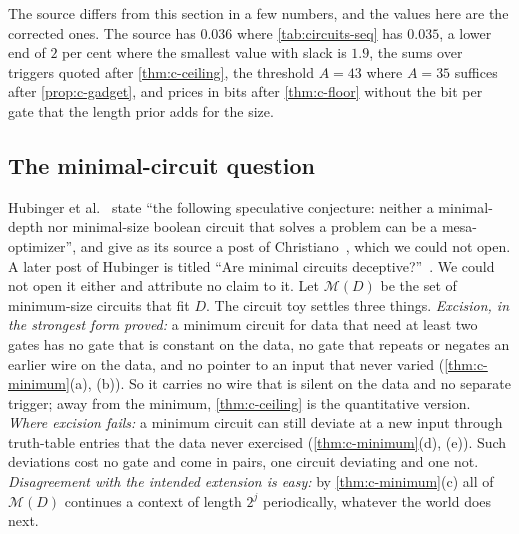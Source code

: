 The source differs from this section in a few numbers, and the values here are the corrected ones. The source
has $0.036$ where \cref{tab:circuits-seq} has $0.035$, a lower end of $2$ per cent where the smallest value
with slack is $1.9$, the sums over triggers quoted after \cref{thm:c-ceiling}, the threshold $A=43$ where
$A=35$ suffices after \cref{prop:c-gadget}, and prices in bits after \cref{thm:c-floor} without the bit per
gate that the length prior adds for the size.

\subsection{The minimal-circuit question}\label{sec:c-minimal}

Hubinger et al.~\cite{hubinger19} state ``the following speculative conjecture: neither a minimal-depth nor
minimal-size boolean circuit that solves a problem can be a mesa-optimizer'', and give as its source a post of
Christiano~\cite{christiano18}, which we could not open. A later post of Hubinger is titled ``Are minimal
circuits deceptive?''~\cite{hubinger19b}. We could not open it either and attribute no claim to it. Let
$\mathcal M(D)$ be the set of minimum-size circuits that fit $D$. The circuit toy settles three things.
\emph{Excision, in the strongest form proved:} a minimum circuit for data that need at least two gates has no
gate that is constant on the data, no gate that repeats or negates an earlier wire on the data, and no pointer
to an input that never varied (\cref{thm:c-minimum}(a), (b)). So it carries no wire that is silent on the data
and no separate trigger; away from the minimum, \cref{thm:c-ceiling} is the quantitative version. \emph{Where
excision fails:} a minimum circuit can still deviate at a new input through truth-table entries that the data
never exercised (\cref{thm:c-minimum}(d), (e)). Such deviations cost no gate and come in pairs, one circuit
deviating and one not. \emph{Disagreement with the intended extension is easy:} by \cref{thm:c-minimum}(c) all
of $\mathcal M(D)$ continues a context of length $2^j$ periodically, whatever the world does next.

